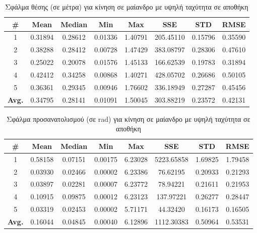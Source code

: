 \begin{table}[H]
    \begin{center}
        \centering
        \caption{Σφάλμα θέσης (σε μέτρα) για κίνηση σε μαίανδρο με υψηλή ταχύτητα σε αποθήκη}
            \label{tab:position_error_meander_fast_warehouse}
        \begin{tabular}{| c | c | c | c | c | c | c | c | }
        \hline
        \rowcolor{Gray}
        \# & Mean & Median & Min & Max & SSE & STD & RMSE \\
        \hline
        1 & 0.31894 & 0.28612 & 0.01336 & 1.40791 & 205.45110 & 0.15796 & 0.35590 \\
        2 & 0.38288 & 0.28412 & 0.00728 & 1.47429 & 383.08797 & 0.28306 & 0.47610 \\
        3 & 0.25022 & 0.20078 & 0.01576 & 1.45133 & 166.62539 & 0.19783 & 0.31894 \\
        4 & 0.42412 & 0.34258 & 0.00868 & 1.40271 & 428.05702 & 0.26686 & 0.50105 \\
        5 & 0.36361 & 0.29345 & 0.00946 & 1.76602 & 336.18949 & 0.27287 & 0.45456 \\
        \hline
        \textbf{Avg.} & 0.34795 & 0.28141 & 0.01091 & 1.50045 & 303.88219 & 0.23572 & 0.42131 \\
        \hline
        \end{tabular}
    \end{center}
\end{table}

\begin{table}[H]
    \centering
    \caption{Σφάλμα προσανατολισμού (σε rad) για κίνηση σε μαίανδρο με υψηλή ταχύτητα σε αποθήκη}
    \label{tab:orientation_error_meander_fast_warehouse}
    \begin{tabular}{| c | c | c | c | c | c | c | c | }
        \hline
        \rowcolor{Gray}
        \# & Mean & Median & Min & Max & SSE & STD & RMSE \\
        \hline
        1 & 0.58158 & 0.07151 & 0.00175 & 6.23028 & 5223.65858 & 1.69825 & 1.79458 \\
        2 & 0.03930 & 0.02466 & 0.00002 & 6.23386 & 76.62195 & 0.20933 & 0.21293 \\
        3 & 0.03897 & 0.02281 & 0.00007 & 6.23772 & 78.94221 & 0.21611 & 0.21953 \\
        4 & 0.10915 & 0.09875 & 0.00012 & 6.23123 & 137.97221 & 0.26277 & 0.28447 \\
        5 & 0.03319 & 0.02453 & 0.00002 & 5.71171 & 44.32420 & 0.16173 & 0.16505 \\
        \hline
        \textbf{Avg.} & 0.16044 & 0.04845 & 0.00040 & 6.12896 & 1112.30383 & 0.50964 & 0.53531 \\
        \hline
    \end{tabular}
\end{table}

